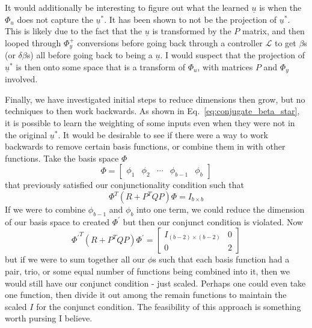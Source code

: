 It would additionally be interesting to figure out what the learned $\underline{u}$ is when the $\Phi_u$ does not capture the $\underline{u}^\ast$. It has been shown to not be the projection of $\underline{u}^\ast$. This is likely due to the fact that the $\underline{u}$ is transformed by the $P$ matrix, and then looped through $\Phi_y^+$ conversions before going back through a controller $\mathcal{L}$ to get $\beta$s (or $\delta \beta$s) all before going back to being a $\underline{u}$. I would suspect that the projection of $\underline{u}^\ast$ is then onto some space that is a transform of $\Phi_u$, with matrices $P$ and $\Phi_y$ involved.

Finally, we have investigated initial steps to reduce dimensions then grow, but no techniques to then work backwards. As shown in Eq.~\ref{eq:conjugate_beta_star}, it is possible to learn the weighting of some inputs even when they were not in the original $\underline{u}^\ast$. It would be desirable to see if there were a way to work backwards to remove certain basis functions, or combine them in with other functions. Take the basis space $\Phi$
\begin{equation}
    \Phi = 
    \begin{bmatrix}
        \phi_1 & \phi_2 & \cdots & \phi_{b-1} & \phi_{b}
    \end{bmatrix}
\end{equation}
that previously satisfied our conjunctionality condition such that
\begin{equation}
    \Phi^T (R + P^T Q P) \Phi = I_{b \times b}
\end{equation}
If we were to combine $\phi_{b-1}$ and $\phi_{b}$ into one term, we could reduce the dimension of our basis space to created $\Phi^\prime$ but then our conjunct condition is violated. Now
\begin{equation}
    {\Phi^\prime}^T (R + P^T Q P) \Phi^\prime 
    = 
    \begin{bmatrix}
        I_{(b-2) \times (b-2)} & 0 \\
        0 & 2
    \end{bmatrix}
\end{equation}
but if we were to sum together all our $\phi$s such that each basis function had a pair, trio, or some equal number of functions being combined into it, then we would still have our conjunct condition - just scaled. Perhaps one could even take one function, then divide it out among the remain functions to maintain the scaled $I$ for the conjunct condition. The feasibility of this approach is something worth pursing I believe.
